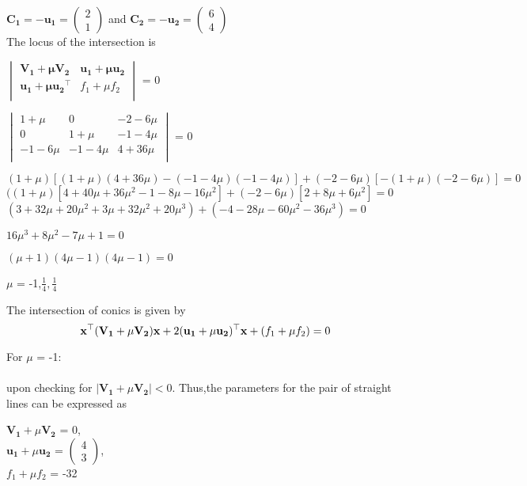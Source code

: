 \documentclass[journal,12pt,twocolumn]{IEEEtran}
\newcommand{\myvec}[1]{\ensuremath{\begin{pmatrix}#1\end{pmatrix}}}
\let\vec\mathbf
\begin{document}
$\vec{C_1=-u_1} = \myvec{2\\1}$ and $\vec{C_2=-u_2} = \myvec{6\\4}$\\

The locus of the intersection is \\

\begin{center}
$\begin{vmatrix}
\vec{V_1+\mu V_2} & \vec{u_1+\mu u_2} \\ 
\vec{u_1+\mu u_2}^\top & f_1+\mu f_2 \\
\end{vmatrix}$ = 0
\end{center}

\begin{center}
$\begin{vmatrix}
{1+\mu} & 0 & {-2-6\mu} \\ 
0 & {1+\mu} & {-1-4\mu} \\
{-1-6\mu} & {-1-4\mu} & {4+36\mu} \\
\end{vmatrix}$ = 0
\end{center} 

${(1+\mu)}[(1+\mu)(4+36\mu)-(-1-4\mu)(-1-4\mu)]+(-2-6\mu)[-(1+\mu)(-2-6\mu)]=0$ \\

$((1+\mu)[4+40\mu+36\mu^2-1-8\mu-16\mu^2]+(-2-6\mu)[2+8\mu+6\mu^2] = 0$ \\

$(3+32\mu+20\mu^2+3\mu+32\mu^2+20\mu^3)+(-4-28\mu-60\mu^2-36\mu^3) = 0$ 

\begin{center}
$16\mu^3+8\mu^2-7\mu+1 = 0$ \\
\end{center}

$(\mu+1)(4\mu-1)(4\mu-1) = 0$
\begin{center}
$\mu$ = -1,$\frac{1}{4},\frac{1}{4}$\\
\end{center}

The intersection of conics is given by
\begin{equation}
{\vec{x^{\top}{(V_1+\mu V_2)}x}+2\vec{(u_1+\mu u_2)^{\top}x}+(f_1+\mu f_2)}=0\\
\end{equation}


For $\mu$ = -1:\\ \\
upon checking for $|\vec{V_1}+\mu\vec{V_2}|<0$. Thus,the parameters for the pair of straight lines can be expressed as \\
\begin{center}
$\vec{V_1}+\mu\vec{V_2}$ = 0, \\ 
$\vec{u_1}+\mu\vec{u_2}$ = $\myvec{4 \\ 3}$,\\
${f_1+\mu f_2}$ = -32 
\end{center} 
\end{document}
